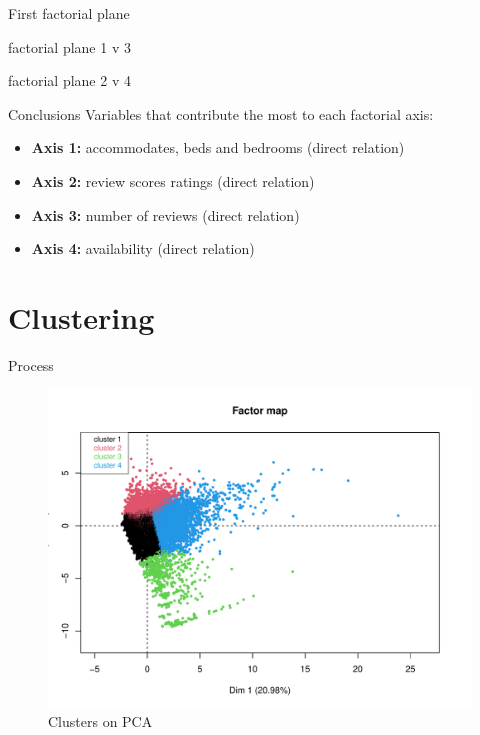 \begin{frame}{First factorial plane}
\end{frame}

\begin{frame}{factorial plane 1 v 3} %
\end{frame}

\begin{frame}{factorial plane 2 v 4} %
\end{frame}

\begin{frame}{Conclusions}
Variables that contribute the most to each factorial axis:
\begin{itemize}
     \item \textbf{Axis 1:} accommodates, beds and bedrooms (direct relation)
     \item \textbf{Axis 2:} review scores ratings (direct relation)
     \item \textbf{Axis 3:} number of reviews (direct relation)
     \item \textbf{Axis 4:} availability (direct relation)
\end{itemize}
\end{frame}

\section{Clustering}
\begin{frame}{Process}
    \begin{figure}[H]
    \centering
    \includegraphics[width=0.7\linewidth]{factor_map}
    \caption{Clusters on PCA}%
    \label{fig:clusters-pca}
    \end{figure}
\end{frame}

